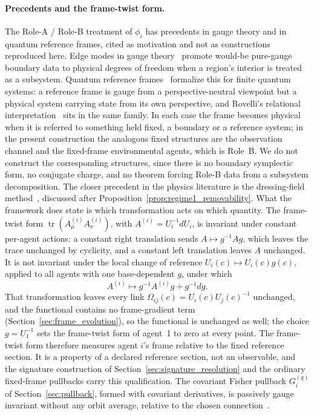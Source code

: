 \documentclass[11pt]{article}
\begin{document}
\paragraph{Precedents and the frame-twist form.}
\label{sec:dual_role_rigor}
The Role-A / Role-B treatment of $\phi_i$ has precedents in gauge theory and in quantum reference frames, cited as motivation and not as constructions reproduced here. Edge modes in gauge theory~\cite{DonnellyFreidel2016} promote would-be pure-gauge boundary data to physical degrees of freedom when a region's interior is treated as a subsystem. Quantum reference frames~\cite{BartlettRudolphSpekkens2007, Vanrietvelde2020, giacomini2019qrf} formalize this for finite quantum systems: a reference frame is gauge from a perspective-neutral viewpoint but a physical system carrying state from its own perspective, and Rovelli's relational interpretation~\cite{Rovelli1996} sits in the same family. In each case the frame becomes physical when it is referred to something held fixed, a boundary or a reference system; in the present construction the analogous fixed structures are the observation channel and the fixed-frame environmental agents, which is Role~B. We do not construct the corresponding structures, since there is no boundary symplectic form, no conjugate charge, and no theorem forcing Role-B data from a subsystem decomposition. The closer precedent in the physics literature is the dressing-field method~\cite{Fournel2014Dressing}, discussed after Proposition~\ref{prop:regime1_removability}. What the framework does state is which transformation acts on which quantity. The frame-twist form $\operatorname{tr}(A^{(i)}_\mu A^{(i)}_\nu)$, with $A^{(i)} = U_i^{-1}dU_i$, is invariant under constant per-agent actions: a constant right translation sends $A \mapsto g^{-1}Ag$, which leaves the trace unchanged by cyclicity, and a constant left translation leaves $A$ unchanged. It is not invariant under the local change of reference $U_i(c) \mapsto U_i(c)g(c)$, applied to all agents with one base-dependent $g$, under which
\begin{equation}
A^{(i)} \longmapsto g^{-1}A^{(i)}g + g^{-1}dg .
\end{equation}
That transformation leaves every link $\Omega_{ij}(c) = U_i(c)U_j(c)^{-1}$ unchanged, and the functional contains no frame-gradient term (Section~\ref{sec:frame_evolution}), so the functional is unchanged as well; the choice $g = U_1^{-1}$ sets the frame-twist form of agent~1 to zero at every point. The frame-twist form therefore measures agent $i$'s frame relative to the fixed reference section. It is a property of a declared reference section, not an observable, and the signature construction of Section~\ref{sec:signature_resolution} and the ordinary fixed-frame pullbacks carry this qualification. The covariant Fisher pullback $G^{(q)}_i$ of Section~\ref{sec:pullback}, formed with covariant derivatives, is passively gauge invariant without any orbit average, relative to the chosen connection~\cite[Ch.~B2]{DennisGaugeVFESuppB2026}.
\end{document}
